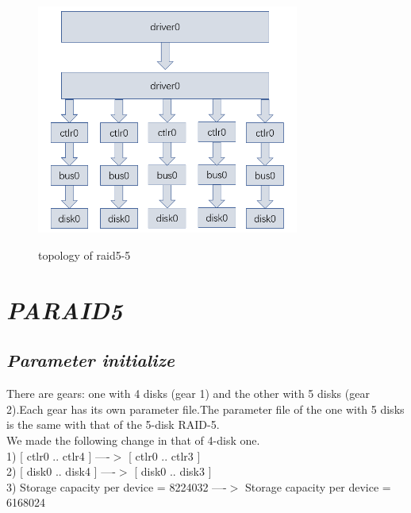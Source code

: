 \documentclass[conference]{IEEEtran}
\begin{document}
\begin{figure}[H]
  \centering
  \includegraphics[width=3.4in]{topo.png}\\
  \caption{topology of raid5-5}\label{figure4}
\end{figure}


\section{\emph{\textbf{PARAID5}}}
\subsection{\emph{\textbf{Parameter initialize}}}
There are gears: one with 4 disks (gear 1) and the other with 5 disks (gear 2).Each gear has its own parameter file.The parameter file of the one with 5 disks is the same with that of the 5-disk RAID-5.\\
We made the following change in that of 4-disk one.\\
1)  [ ctlr0 .. ctlr4 ] ----$>$  [ ctlr0 .. ctlr3 ]\\
2) [ disk0 .. disk4 ] ----$>$ [ disk0 .. disk3 ]\\
3) Storage capacity per device  =  8224032  ----$>$ Storage capacity per device  =  6168024\\
\end{document}
